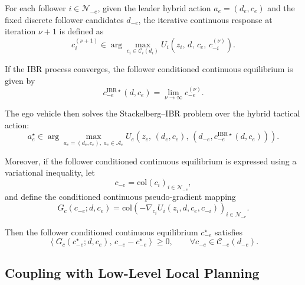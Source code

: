 \documentclass[final ,3p, times]{elsarticle}
\begin{document}
For each follower $i \in \mathcal{N}_{-e}$, given the leader hybrid action $a_e=(d_e,c_e)$ and the fixed discrete follower candidates $d_{-e}$, the iterative continuous response at iteration $\nu+1$ is defined as
\begin{equation}
c_i^{(\nu+1)}
\in
\arg\max_{c_i \in \mathcal{C}_i(d_i)}
U_i\!\left(
z_i,\,
d,\,
c_e,\,
c_{-i}^{(\nu)}
\right).
\label{eq:ibr_update}
\end{equation}

If the IBR process converges, the follower conditioned continuous equilibrium is given by
\begin{equation}
c_{-e}^{\mathrm{IBR}\star}(d,c_e)
=
\lim_{\nu\to\infty}
c_{-e}^{(\nu)}.
\label{eq:ibr_equilibrium}
\end{equation}

The ego vehicle then solves the Stackelberg--IBR problem over the hybrid tactical action:
\begin{equation}
a_e^\star
\in
\arg\max_{a_e=(d_e,c_e),\; a_e\in \mathcal{A}_e}
U_e\!\left(
z_e,\,
(d_e,c_e),\,
(d_{-e},c_{-e}^{\mathrm{IBR}\star}(d,c_e))
\right).
\label{eq:leader_stackelberg_ibr}
\end{equation}

Moreover, if the follower conditioned continuous equilibrium is expressed using a variational inequality, let
\begin{equation}
c_{-e} = \mathrm{col}(c_i)_{i\in\mathcal{N}_{-e}},
\label{eq:follower_stack_vector}
\end{equation}
and define the conditioned continuous pseudo-gradient mapping
\begin{equation}
G_c(c_{-e};d,c_e)
=
\mathrm{col}
\left(
-\nabla_{c_i} U_i(z_i,d,c_e,c_{-i})
\right)_{i\in\mathcal{N}_{-e}}.
\label{eq:pseudogradient}
\end{equation}

Then the follower conditioned continuous equilibrium $c_{-e}^\star$ satisfies
\begin{equation}
\left\langle
G_c(c_{-e}^\star;d,c_e),\,
c_{-e}-c_{-e}^\star
\right\rangle
\ge 0,
\qquad
\forall c_{-e}\in \mathcal{C}_{-e}(d_{-e}).
\label{eq:vi_formulation}
\end{equation}





\subsection{Coupling with Low-Level Local Planning}
\label{subsec:coupling_local_planning}
\end{document}
